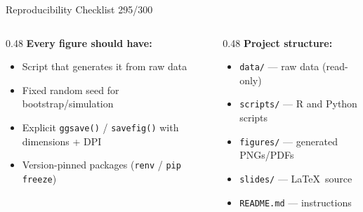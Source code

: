 \documentclass[10pt]{beamer}
\newcommand{\smark}[1]{\hfill{\scriptsize\color{codegray}#1}}
\begin{document}
\begin{frame}{Reproducibility Checklist}
\smark{295/300}
\begin{columns}[T]
\begin{column}{0.48\textwidth}
    \textbf{Every figure should have:}
    \begin{itemize}
        \item Script that generates it from raw data
        \item Fixed random seed for bootstrap/simulation
        \item Explicit \texttt{ggsave()} / \texttt{savefig()} with dimensions + DPI
        \item Version-pinned packages (\texttt{renv} / \texttt{pip freeze})
    \end{itemize}
\end{column}
\begin{column}{0.48\textwidth}
    \textbf{Project structure:}
    \begin{itemize}
        \item \texttt{data/} --- raw data (read-only)
        \item \texttt{scripts/} --- R and Python scripts
        \item \texttt{figures/} --- generated PNGs/PDFs
        \item \texttt{slides/} --- \LaTeX\ source
        \item \texttt{README.md} --- instructions
    \end{itemize}
\end{column}
\end{columns}
\end{frame}
\end{document}
